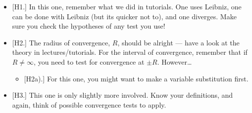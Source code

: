 \documentclass[
  12pt,
  a4paper]{extarticle}
\providecommand{\tightlist}{%
  \setlength{\itemsep}{0pt}\setlength{\parskip}{0pt}}
\theoremstyle{plain}
\theoremstyle{plain}
\theoremstyle{plain}
\theoremstyle{plain}
\theoremstyle{plain}
\theoremstyle{definition}
\theoremstyle{definition}
\theoremstyle{definition}
\theoremstyle{remark}
\renewcommand{\;}{\,}
\begin{document}
\begin{itemize}
\tightlist
\item
  {[}H1.{]} In this one, remember what we did in tutorials. One uses Leibniz, one can be done with Leibniz (but its quicker not to), and one diverges. Make sure you check the hypotheses of any test you use!
\item
  {[}H2.{]} The radius of convergence, \(R\), should be alright --- have a look at the theory in lectures/tutorials. For the interval of convergence, remember that if \(R \neq \infty\), you need to test for convergence at \(\pm R\). However\ldots{}

  \begin{itemize}
  \tightlist
  \item
    {[}H2a).{]} For this one, you might want to make a variable substitution first.
  \end{itemize}
\item
  {[}H3.{]} This one is only slightly more involved. Know your definitions, and again, think of possible convergence tests to apply.
\end{itemize}
\end{document}
